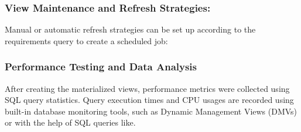 \subsubsection{View Maintenance and Refresh Strategies:}\label{View_maintainance} Manual or automatic refresh strategies can be set up according to the requirements query to create a scheduled job: \vspace{.4cm}



\subsubsection{Performance Testing and Data Analysis} After creating the materialized views, performance metrics were collected using SQL query statistics. Query execution times and CPU usages are recorded using built-in database monitoring tools, such as Dynamic Management Views (DMVs) or with the help of SQL queries like. 

 

